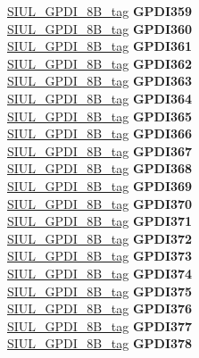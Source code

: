 \begin{DoxyCompactItemize}
\begin{tabbing}
\>\>\mbox{\hyperlink{unionSIUL__GPDI__8B__tag}{SIUL\_GPDI\_8B\_tag}} {\bfseries GPDI359}\\
\>\>\mbox{\hyperlink{unionSIUL__GPDI__8B__tag}{SIUL\_GPDI\_8B\_tag}} {\bfseries GPDI360}\\
\>\>\mbox{\hyperlink{unionSIUL__GPDI__8B__tag}{SIUL\_GPDI\_8B\_tag}} {\bfseries GPDI361}\\
\>\>\mbox{\hyperlink{unionSIUL__GPDI__8B__tag}{SIUL\_GPDI\_8B\_tag}} {\bfseries GPDI362}\\
\>\>\mbox{\hyperlink{unionSIUL__GPDI__8B__tag}{SIUL\_GPDI\_8B\_tag}} {\bfseries GPDI363}\\
\>\>\mbox{\hyperlink{unionSIUL__GPDI__8B__tag}{SIUL\_GPDI\_8B\_tag}} {\bfseries GPDI364}\\
\>\>\mbox{\hyperlink{unionSIUL__GPDI__8B__tag}{SIUL\_GPDI\_8B\_tag}} {\bfseries GPDI365}\\
\>\>\mbox{\hyperlink{unionSIUL__GPDI__8B__tag}{SIUL\_GPDI\_8B\_tag}} {\bfseries GPDI366}\\
\>\>\mbox{\hyperlink{unionSIUL__GPDI__8B__tag}{SIUL\_GPDI\_8B\_tag}} {\bfseries GPDI367}\\
\>\>\mbox{\hyperlink{unionSIUL__GPDI__8B__tag}{SIUL\_GPDI\_8B\_tag}} {\bfseries GPDI368}\\
\>\>\mbox{\hyperlink{unionSIUL__GPDI__8B__tag}{SIUL\_GPDI\_8B\_tag}} {\bfseries GPDI369}\\
\>\>\mbox{\hyperlink{unionSIUL__GPDI__8B__tag}{SIUL\_GPDI\_8B\_tag}} {\bfseries GPDI370}\\
\>\>\mbox{\hyperlink{unionSIUL__GPDI__8B__tag}{SIUL\_GPDI\_8B\_tag}} {\bfseries GPDI371}\\
\>\>\mbox{\hyperlink{unionSIUL__GPDI__8B__tag}{SIUL\_GPDI\_8B\_tag}} {\bfseries GPDI372}\\
\>\>\mbox{\hyperlink{unionSIUL__GPDI__8B__tag}{SIUL\_GPDI\_8B\_tag}} {\bfseries GPDI373}\\
\>\>\mbox{\hyperlink{unionSIUL__GPDI__8B__tag}{SIUL\_GPDI\_8B\_tag}} {\bfseries GPDI374}\\
\>\>\mbox{\hyperlink{unionSIUL__GPDI__8B__tag}{SIUL\_GPDI\_8B\_tag}} {\bfseries GPDI375}\\
\>\>\mbox{\hyperlink{unionSIUL__GPDI__8B__tag}{SIUL\_GPDI\_8B\_tag}} {\bfseries GPDI376}\\
\>\>\mbox{\hyperlink{unionSIUL__GPDI__8B__tag}{SIUL\_GPDI\_8B\_tag}} {\bfseries GPDI377}\\
\>\>\mbox{\hyperlink{unionSIUL__GPDI__8B__tag}{SIUL\_GPDI\_8B\_tag}} {\bfseries GPDI378}\\

\end{tabbing}
\end{DoxyCompactItemize}
